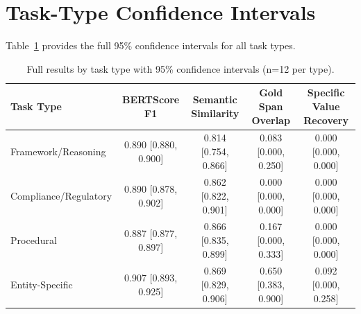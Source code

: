 \documentclass[sigconf,balance=false]{acmart}
\begin{document}
\section{Task-Type Confidence Intervals}
\label{app:ci}

Table~\ref{tab:ci} provides the full 95\% confidence intervals for all task types.

\begin{table}[h]
\caption{Full results by task type with 95\% confidence intervals (n=12 per type).}
\label{tab:ci}
\begin{tabular}{lcccc}
\toprule
\textbf{Task Type} & \textbf{BERTScore F1} & \textbf{Semantic Similarity} & \textbf{Gold Span Overlap} & \textbf{Specific Value Recovery} \\
\midrule
Framework/Reasoning & 0.890 [0.880, 0.900] & 0.814 [0.754, 0.866] & 0.083 [0.000, 0.250] & 0.000 [0.000, 0.000] \\
Compliance/Regulatory & 0.890 [0.878, 0.902] & 0.862 [0.822, 0.901] & 0.000 [0.000, 0.000] & 0.000 [0.000, 0.000] \\
Procedural & 0.887 [0.877, 0.897] & 0.866 [0.835, 0.899] & 0.167 [0.000, 0.333] & 0.000 [0.000, 0.000] \\
Entity-Specific & 0.907 [0.893, 0.925] & 0.869 [0.829, 0.906] & 0.650 [0.383, 0.900] & 0.092 [0.000, 0.258] \\
\bottomrule
\end{tabular}
\end{table}
\end{document}
